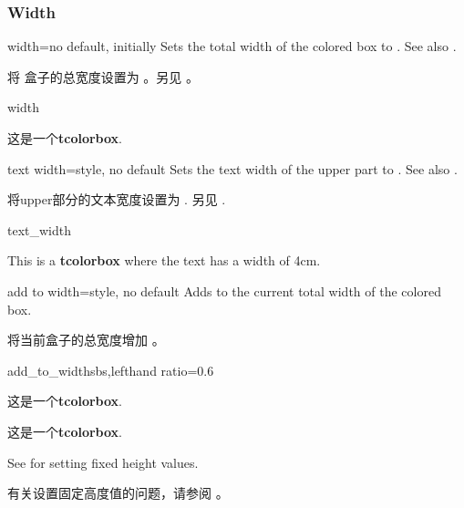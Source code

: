 \subsubsection{Width} 

\begin{docTcbKey}{width}{=}{no default, initially }
Sets the total width of the colored box to .
See also .

将%
盒子的总宽度设置为 。另见 。
\begin{exdispExample}{width} 

\begin{tcolorbox}[width=\linewidth/2]
这是一个\textbf{tcolorbox}.
\end{tcolorbox}
\end{exdispExample}
\end{docTcbKey}


\begin{docTcbKey}[][doc new=2014-10-31]{text width}{=}{style, no default}
Sets the text width of the upper part to .
See also .

将upper部分的文本宽度设置为 .
另见 .
\begin{exdispExample}{text_width}

\begin{tcolorbox}[text width=4cm]
This is a \textbf{tcolorbox} where the text has a width of 4cm.
\end{tcolorbox}
\end{exdispExample}
\end{docTcbKey}

\begin{docTcbKey}[][doc new=2014-11-07]{add to width}{=}{style, no default}
Adds  to the current total width of the colored box.

将当前盒子的总宽度增加  。    
\begin{exdispExample*}{add_to_width}{sbs,lefthand ratio=0.6}

\begin{tcolorbox}
这是一个\textbf{tcolorbox}.
\end{tcolorbox}

\begin{tcolorbox}[add to width=1cm]
这是一个\textbf{tcolorbox}.
\end{tcolorbox}
\end{exdispExample*}
\end{docTcbKey}

See  for setting fixed height values.

有关设置固定高度值的问题，请参阅 。